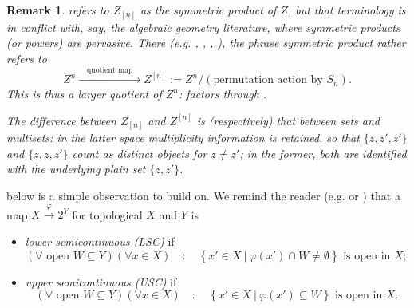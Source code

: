 \documentclass[11pt,leqno]{article}
\theoremstyle{plain}
\theoremstyle{plain}
\theoremstyle{plain}
\newtheorem{remark}[lemma]{Remark}
\numberwithin{equation}{section}
\theoremstyle{nonumberplain}
\newcommand\1{{\bf 1}}
\begin{document}
\begin{remark}
  \cite[Paragraph preceding Theorem B.1]{MR450972} refers to $Z_{[n]}$ as the {\it symmetric product} of $Z$, but that terminology is in conflict with, say, the algebraic geometry literature, where symmetric products (or powers) are pervasive. There (e.g. \cite[p.18]{acgh1}, \cite[Example 10.23]{har_ag}, \cite[\S 1]{Polizzi}, \cite{CaCi93}), the phrase {\it symmetric product} rather refers to
  \begin{equation}\label{eq:zn2z^n}
    Z^n
    \xrightarrow{\quad\text{quotient map}\quad}
    Z^{[n]}
    :=
    Z^n/\left(\text{permutation action by $S_n$}\right).
  \end{equation}
  This is thus a larger quotient of $Z^n$:  factors through .

  The difference between $Z_{[n]}$ and $Z^{[n]}$ is (respectively) that between sets and {\it multi}sets: in the latter space multiplicity information is retained, so that $\{z,z',z'\}$ and $\{z,z,z'\}$ count as distinct objects for $z\ne z'$; in the former, both are identified with the underlying plain set $\{z,z'\}$. 
\end{remark}

 below is a simple observation to build on. We remind the reader (e.g. \cite[p.712]{zbMATH06329568} or \cite[Definition 7.1.1]{kt_corresp}) that a map $X\xrightarrow{\varphi} 2^Y$ for topological $X$ and $Y$ is
\begin{itemize}[wide]
\item {\it lower semicontinuous (LSC)} if
  \begin{equation*}
    \left(\forall \text{ open }W\subseteq Y\right)
    \left(\forall x\in X\right)
    \quad:\quad
    \left\{x'\in X\ |\ \varphi(x')\cap W\ne\emptyset\right\}
    \text{ is open in }X;
  \end{equation*}

  
\item {\it upper semicontinuous (USC)} if
  \begin{equation*}
    \left(\forall \text{ open }W\subseteq Y\right)
    \left(\forall x\in X\right)
    \quad:\quad
    \left\{x'\in X\ |\ \varphi(x')\subseteq W\right\}
    \text{ is open in }X.
  \end{equation*}
\end{itemize}
\end{document}
